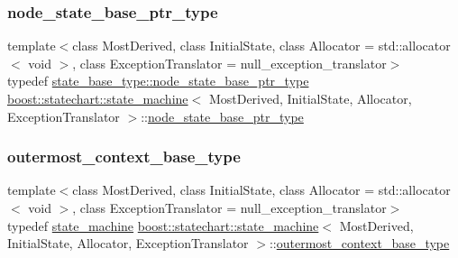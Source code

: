 \subsubsection{\texorpdfstring{node\+\_\+state\+\_\+base\+\_\+ptr\+\_\+type}{node\_state\_base\_ptr\_type}}
{\footnotesize\ttfamily template$<$class Most\+Derived, class Initial\+State, class Allocator = std\+::allocator$<$ void $>$, class Exception\+Translator = null\+\_\+exception\+\_\+translator$>$ \\
typedef \mbox{\hyperlink{classboost_1_1statechart_1_1detail_1_1state__base_a8e3dd0f80bf95d7df21417a50f1dbaa1}{state\+\_\+base\+\_\+type\+::node\+\_\+state\+\_\+base\+\_\+ptr\+\_\+type}} \mbox{\hyperlink{classboost_1_1statechart_1_1state__machine}{boost\+::statechart\+::state\+\_\+machine}}$<$ Most\+Derived, Initial\+State, Allocator, Exception\+Translator $>$\+::\mbox{\hyperlink{classboost_1_1statechart_1_1state__machine_a5d90f1176309ec8307979aa79dd6f4a3}{node\+\_\+state\+\_\+base\+\_\+ptr\+\_\+type}}}

\mbox{\label{classboost_1_1statechart_1_1state__machine_a05b007af532fafe2f186a18351beaa5e}} 
\subsubsection{\texorpdfstring{outermost\+\_\+context\+\_\+base\+\_\+type}{outermost\_context\_base\_type}}
{\footnotesize\ttfamily template$<$class Most\+Derived, class Initial\+State, class Allocator = std\+::allocator$<$ void $>$, class Exception\+Translator = null\+\_\+exception\+\_\+translator$>$ \\
typedef \mbox{\hyperlink{classboost_1_1statechart_1_1state__machine}{state\+\_\+machine}} \mbox{\hyperlink{classboost_1_1statechart_1_1state__machine}{boost\+::statechart\+::state\+\_\+machine}}$<$ Most\+Derived, Initial\+State, Allocator, Exception\+Translator $>$\+::\mbox{\hyperlink{classboost_1_1statechart_1_1state__machine_a05b007af532fafe2f186a18351beaa5e}{outermost\+\_\+context\+\_\+base\+\_\+type}}}

\mbox{\label{classboost_1_1statechart_1_1state__machine_a3c047829e797a9501c7d69151d17e368}} 
